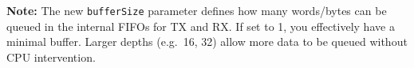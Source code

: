 \label{table:uart_params}
\endgroup

\noindent
\textbf{Note:} The new \texttt{bufferSize} parameter defines how many words/bytes can be queued in the internal FIFOs for TX and RX. If set to 1, you effectively have a minimal buffer. Larger depths (e.g.\ 16, 32) allow more data to be queued without CPU intervention.
